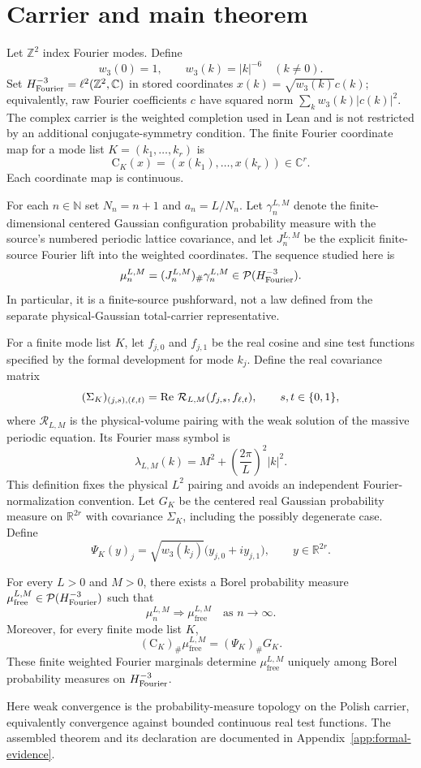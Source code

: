 \section{Carrier and main theorem}
\label{sec:theorem}

Let $\mathbb{Z}^{2}$ index Fourier modes. Define
\[
 w_3(0)=1,\qquad w_3(k)=|k|^{-6}\quad(k\ne 0).
\]
Set $H^{-3}_{\mathrm{Fourier}}=\ell^2(\mathbb{Z}^{2},\mathbb{C})$ in stored coordinates $x(k)=\sqrt{w_3(k)}c(k)$; equivalently, raw Fourier coefficients $c$ have squared norm $\sum_k w_3(k)|c(k)|^2$. The complex carrier is the weighted completion used in Lean and is not restricted by an additional conjugate-symmetry condition. The finite Fourier coordinate map for a mode list $K=(k_1,\ldots,k_r)$ is
\[
  \mathrm{C}_K(x)=(x(k_1),\ldots,x(k_r))\in\mathbb{C}^{r}.
\]
Each coordinate map is continuous.

For each $n\in\mathbb{N}$ set $N_n=n+1$ and $a_n=L/N_n$. Let $\gamma_n^{L,M}$ denote the finite-dimensional centered Gaussian configuration probability measure with the source's numbered periodic lattice covariance, and let $J_n^{L,M}$ be the explicit finite-source Fourier lift into the weighted coordinates. The sequence studied here is
\[
  \mu_n^{L,M}=(J_n^{L,M})_{\#}\gamma_n^{L,M}
  \in\mathcal{P}(H^{-3}_{\mathrm{Fourier}}).
\]
In particular, it is a finite-source pushforward, not a law defined from the separate physical-Gaussian total-carrier representative.

For a finite mode list $K$, let $f_{j,0}$ and $f_{j,1}$ be the real cosine and sine test functions specified by the formal development for mode $k_j$. Define the real covariance matrix
\[
  (\Sigma_K)_{(j,s),(\ell,t)}
  =\operatorname{Re}\,\mathcal{R}_{L,M}(f_{j,s},f_{\ell,t}),
  \qquad s,t\in\{0,1\},
\]
where $\mathcal{R}_{L,M}$ is the physical-volume pairing with the weak solution of the massive periodic equation. Its Fourier mass symbol is
\[
  \lambda_{L,M}(k)=M^2+\left(\frac{2\pi}{L}\right)^2|k|^2.
\]
This definition fixes the physical $L^2$ pairing and avoids an independent Fourier-normalization convention. Let $G_K$ be the centered real Gaussian probability measure on $\mathbb{R}^{2r}$ with covariance $\Sigma_K$, including the possibly degenerate case. Define
\[
  \Psi_K(y)_j=\sqrt{w_3(k_j)}\bigl(y_{j,0}+i y_{j,1}\bigr),
  \qquad y\in\mathbb{R}^{2r}.
\]

\begin{theorem}
\label{thm:main}
For every $L>0$ and $M>0$, there exists a Borel probability measure
$\mu_{\mathrm{free}}^{L,M}\in\mathcal{P}(H^{-3}_{\mathrm{Fourier}})$ such that
\[
  \mu_n^{L,M}\Longrightarrow\mu_{\mathrm{free}}^{L,M}
  \quad\text{as }n\to\infty.
\]
Moreover, for every finite mode list $K$,
\[
  (\mathrm{C}_K)_{\#}\mu_{\mathrm{free}}^{L,M}
  =(\Psi_K)_{\#}G_K.
\]
These finite weighted Fourier marginals determine $\mu_{\mathrm{free}}^{L,M}$ uniquely among Borel probability measures on $H^{-3}_{\mathrm{Fourier}}$.
\end{theorem}

Here weak convergence is the probability-measure topology on the Polish carrier, equivalently convergence against bounded continuous real test functions. The assembled theorem and its declaration are documented in Appendix~\ref{app:formal-evidence}.
